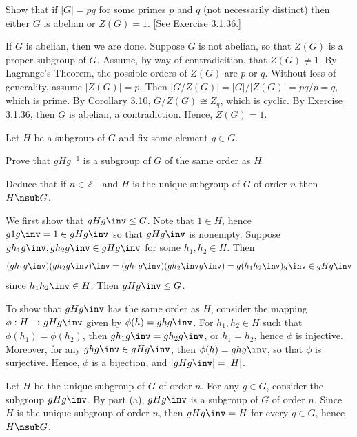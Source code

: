 \begin{exercise}\label{ex3.2.4}
    Show that if $|G| = pq$ for some primes $p$ and $q$ (not necessarily distinct) then either $G$ is abelian or $Z(G) = 1$. [See \hyperref[ex3.1.36]{Exercise 3.1.36}.]
\end{exercise}

\begin{sol}
    If $G$ is abelian, then we are done. Suppose $G$ is not abelian, so that $Z(G)$ is a proper subgroup of $G$. Assume, by way of contradicition, that $Z(G) \neq 1$. By Lagrange's Theorem, the possible orders of $Z(G)$ are $p$ or $q$. Without loss of generality, assume $|Z(G)| = p$. Then $|G/Z(G)| = |G|/|Z(G)| = pq/p = q$, which is prime. By Corollary 3.10, $G/Z(G) \cong Z_q$, which is cyclic. By \hyperref[ex3.1.36]{Exercise 3.1.36}, then $G$ is abelian, a contradiction. Hence, $Z(G) = 1$.
\end{sol}

\begin{specialexercise}\label{ex3.2.5}
    Let $H$ be a subgroup of $G$ and fix some element $g \in G$. 
    \begin{subproblems}
        \item Prove that $gH g^{-1}$ is a subgroup of $G$ of the same order as $H$.
        \item Deduce that if $n \in \mathbb{Z}^+$ and $H$ is the unique subgroup of $G$ of order $n$ then $H \nsub G$.
    \end{subproblems}
\end{specialexercise}

\begin{solalph}
    \item We first show that $gHg\inv \leq G$. Note that $1 \in H$, hence $g1g\inv = 1 \in gHg\inv$ so that $gHg\inv$ is nonempty. Suppose $gh_1g\inv, gh_2g\inv \in gHg\inv$ for some $h_1, h_2 \in H$. Then
    \[(gh_1g\inv)(gh_2g\inv)\inv = (gh_1g\inv)(gh_2\inv g\inv) = g(h_1h_2\inv)g\inv \in gHg\inv\]
    since $h_1h_2\inv \in H$. Then $gHg\inv \leq G$.

    To show that $gHg\inv$ has the same order as $H$, consider the mapping $\phi : H \to gHg\inv$ given by $\phi(h) = ghg\inv$. For $h_1, h_2 \in H$ such that $\phi(h_1) = \phi(h_2)$, then $gh_1g\inv = gh_2g\inv$, or $h_1 = h_2$, hence $\phi$ is injective. Moreover, for any $ghg\inv \in gHg\inv$, then $\phi(h) = ghg\inv$, so that $\phi$ is surjective. Hence, $\phi$ is a bijection, and $|gHg\inv| = |H|$.
    \item Let $H$ be the unique subgroup of $G$ of order $n$. For any $g \in G$, consider the subgroup $gHg\inv$. By part (a), $gHg\inv$ is a subgroup of $G$ of order $n$. Since $H$ is the unique subgroup of order $n$, then $gHg\inv = H$ for every $g \in G$, hence $H \nsub G$.
\end{solalph}

